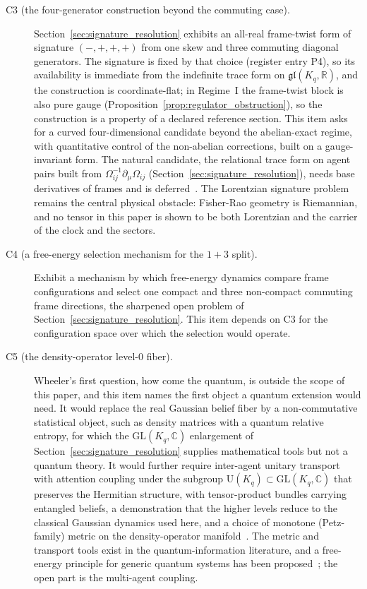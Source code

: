 \begin{description}
\item[C3 (the four-generator construction beyond the commuting case).] Section~\ref{sec:signature_resolution} exhibits an all-real frame-twist form of signature $(-,+,+,+)$ from one skew and three commuting diagonal generators. The signature is fixed by that choice (register entry P4), so its availability is immediate from the indefinite trace form on $\mathfrak{gl}(K_q, \mathbb{R})$, and the construction is coordinate-flat; in Regime~I the frame-twist block is also pure gauge (Proposition~\ref{prop:regulator_obstruction}), so the construction is a property of a declared reference section. This item asks for a curved four-dimensional candidate beyond the abelian-exact regime, with quantitative control of the non-abelian corrections, built on a gauge-invariant form. The natural candidate, the relational trace form on agent pairs built from $\Omega_{ij}^{-1}\partial_\mu\Omega_{ij}$ (Section~\ref{sec:signature_resolution}), needs base derivatives of frames and is deferred~\cite{DennisGaugeVFESuppB2026}. The Lorentzian signature problem remains the central physical obstacle: Fisher-Rao geometry is Riemannian, and no tensor in this paper is shown to be both Lorentzian and the carrier of the clock and the sectors.
\item[C4 (a free-energy selection mechanism for the $1{+}3$ split).] Exhibit a mechanism by which free-energy dynamics compare frame configurations and select one compact and three non-compact commuting frame directions, the sharpened open problem of Section~\ref{sec:signature_resolution}. This item depends on C3 for the configuration space over which the selection would operate.
\item[C5 (the density-operator level-0 fiber).] Wheeler's first question, how come the quantum, is outside the scope of this paper, and this item names the first object a quantum extension would need. It would replace the real Gaussian belief fiber by a non-commutative statistical object, such as density matrices with a quantum relative entropy, for which the $\mathrm{GL}(K_q, \mathbb{C})$ enlargement of Section~\ref{sec:signature_resolution} supplies mathematical tools but not a quantum theory. It would further require inter-agent unitary transport with attention coupling under the subgroup $\mathrm{U}(K_q) \subset \mathrm{GL}(K_q, \mathbb{C})$ that preserves the Hermitian structure, with tensor-product bundles carrying entangled beliefs, a demonstration that the higher levels reduce to the classical Gaussian dynamics used here, and a choice of monotone (Petz-family) metric on the density-operator manifold~\cite{Petz1996}. The metric and transport tools exist in the quantum-information literature, and a free-energy principle for generic quantum systems has been proposed~\cite{Fields2022}; the open part is the multi-agent coupling.

\end{description}
